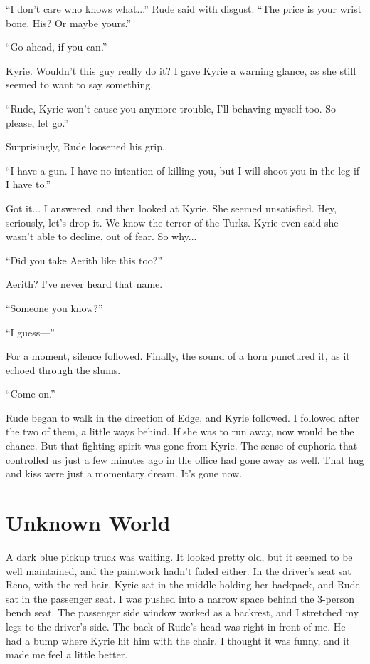 \documentclass[oneside]{book}
\begin{document}
“I don’t care who knows what...” Rude said with disgust. “The price is your wrist bone. His? Or maybe yours.”

“Go ahead, if you can.”

Kyrie. Wouldn’t this guy really do it? I gave Kyrie a warning glance, as she still seemed to want to say something.

“Rude, Kyrie won’t cause you anymore trouble, I’ll behaving myself too. So please, let go.”

Surprisingly, Rude loosened his grip.

“I have a gun. I have no intention of killing you, but I will shoot you in the leg if I have to.”

Got it... I answered, and then looked at Kyrie. She seemed unsatisfied. Hey, seriously, let’s drop it. We know the terror of the Turks. Kyrie even said she wasn’t able to decline, out of fear. So why...

“Did you take Aerith like this too?”

Aerith? I’ve never heard that name.

“Someone you know?”

“I guess—”

For a moment, silence followed. Finally, the sound of a horn punctured it, as it echoed through the slums.

“Come on.”

Rude began to walk in the direction of Edge, and Kyrie followed. I followed after the two of them, a little ways behind. If she was to run away, now would be the chance. But that fighting spirit was gone from Kyrie. The sense of euphoria that controlled us just a few minutes ago in the office had gone away as well. That hug and kiss were just a momentary dream. It’s gone now.

\chapter{Unknown World}
A dark blue pickup truck was waiting. It looked pretty old, but it seemed to be well maintained, and the paintwork hadn’t faded either. In the driver’s seat sat Reno, with the red hair. Kyrie sat in the middle holding her backpack, and Rude sat in the passenger seat. I was pushed into a narrow space behind the 3-person bench seat. The passenger side window worked as a backrest, and I stretched my legs to the driver’s side. The back of Rude’s head was right in front of me. He had a bump where Kyrie hit him with the chair. I thought it was funny, and it made me feel a little better.
\end{document}
